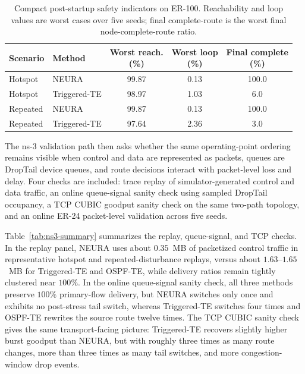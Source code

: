 \documentclass[5p,times]{elsarticle}
\begin{document}
\begin{table}[t]
\centering
\footnotesize
\caption{Compact post-startup safety indicators on ER-100. Reachability and loop values are worst cases over five seeds; final complete-route is the worst final node-complete-route ratio.}
\label{tab:main-safety}
\setlength{\tabcolsep}{3pt}
\begin{tabular}{llccc}
\toprule
Scenario & Method & \shortstack{Worst reach.\\(\%)} & \shortstack{Worst loop\\(\%)} & \shortstack{Final complete\\(\%)} \\
\midrule
Hotspot & NEURA & 99.87 & 0.13 & 100.0 \\
Hotspot & Triggered-TE & 98.97 & 1.03 & 6.0 \\
Repeated & NEURA & 99.87 & 0.13 & 100.0 \\
Repeated & Triggered-TE & 97.64 & 2.36 & 3.0 \\
\bottomrule
\end{tabular}
\end{table}

The ns-3 validation path then asks whether the same operating-point ordering remains visible when control and data are represented as packets, queues are DropTail device queues, and route decisions interact with packet-level loss and delay. Four checks are included: trace replay of simulator-generated control and data traffic, an online queue-signal sanity check using sampled DropTail occupancy, a TCP CUBIC goodput sanity check on the same two-path topology, and an online ER-24 packet-level validation across five seeds.



Table~\ref{tab:ns3-summary} summarizes the replay, queue-signal, and TCP checks. In the replay panel, NEURA uses about $0.35$~MB of packetized control traffic in representative hotspot and repeated-disturbance replays, versus about $1.63$--$1.65$~MB for Triggered-TE and OSPF-TE, while delivery ratios remain tightly clustered near $100\%$. In the online queue-signal sanity check, all three methods preserve $100\%$ primary-flow delivery, but NEURA switches only once and exhibits no post-stress tail switch, whereas Triggered-TE switches four times and OSPF-TE rewrites the source route twelve times. The TCP CUBIC sanity check gives the same transport-facing picture: Triggered-TE recovers slightly higher burst goodput than NEURA, but with roughly three times as many route changes, more than three times as many tail switches, and more congestion-window drop events.
\end{document}
